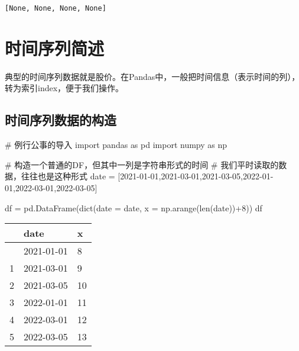 \documentclass[
  letterpaper,
  DIV=11,
  numbers=noendperiod]{scrreprt}
\newenvironment{Shaded}{\begin{snugshade}}{\end{snugshade}}
\newcommand{\BuiltInTok}[1]{\textcolor[rgb]{0.00,0.23,0.31}{#1}}
\newcommand{\CommentTok}[1]{\textcolor[rgb]{0.37,0.37,0.37}{#1}}
\newcommand{\DecValTok}[1]{\textcolor[rgb]{0.68,0.00,0.00}{#1}}
\newcommand{\ImportTok}[1]{\textcolor[rgb]{0.00,0.46,0.62}{#1}}
\newcommand{\NormalTok}[1]{\textcolor[rgb]{0.00,0.23,0.31}{#1}}
\newcommand{\OperatorTok}[1]{\textcolor[rgb]{0.37,0.37,0.37}{#1}}
\newcommand{\StringTok}[1]{\textcolor[rgb]{0.13,0.47,0.30}{#1}}
\begin{document}
\begin{verbatim}
[None, None, None, None]
\end{verbatim}

\hypertarget{ux65f6ux95f4ux5e8fux5217ux7b80ux8ff0}{%
\section{时间序列简述}\label{ux65f6ux95f4ux5e8fux5217ux7b80ux8ff0}}

典型的时间序列数据就是股价。在Pandas中，一般把时间信息（表示时间的列），转为索引index，便于我们操作。

\hypertarget{ux65f6ux95f4ux5e8fux5217ux6570ux636eux7684ux6784ux9020}{%
\subsection{时间序列数据的构造}\label{ux65f6ux95f4ux5e8fux5217ux6570ux636eux7684ux6784ux9020}}

\begin{Shaded}
\begin{Highlighting}[]
\CommentTok{\# 例行公事的导入}
\ImportTok{import}\NormalTok{ pandas }\ImportTok{as}\NormalTok{ pd}
\ImportTok{import}\NormalTok{ numpy }\ImportTok{as}\NormalTok{ np}

\CommentTok{\# 构造一个普通的DF，但其中一列是字符串形式的时间}
\CommentTok{\# 我们平时读取的数据，往往也是这种形式}
\NormalTok{date }\OperatorTok{=}\NormalTok{  [}\StringTok{\textquotesingle{}2021{-}01{-}01\textquotesingle{}}\NormalTok{,}\StringTok{\textquotesingle{}2021{-}03{-}01\textquotesingle{}}\NormalTok{,}\StringTok{\textquotesingle{}2021{-}03{-}05\textquotesingle{}}\NormalTok{,}\StringTok{\textquotesingle{}2022{-}01{-}01\textquotesingle{}}\NormalTok{,}\StringTok{\textquotesingle{}2022{-}03{-}01\textquotesingle{}}\NormalTok{,}\StringTok{\textquotesingle{}2022{-}03{-}05\textquotesingle{}}\NormalTok{]}

\NormalTok{df }\OperatorTok{=}\NormalTok{ pd.DataFrame(}\BuiltInTok{dict}\NormalTok{(date }\OperatorTok{=}\NormalTok{ date,}
\NormalTok{                       x }\OperatorTok{=}\NormalTok{ np.arange(}\BuiltInTok{len}\NormalTok{(date))}\OperatorTok{+}\DecValTok{8}\NormalTok{))}
\NormalTok{df}
\end{Highlighting}
\end{Shaded}

\begin{longtable}[]{@{}lll@{}}
\toprule\noalign{}
& date & x \\
\midrule\noalign{}
\endhead
\bottomrule\noalign{}
\endlastfoot
0 & 2021-01-01 & 8 \\
1 & 2021-03-01 & 9 \\
2 & 2021-03-05 & 10 \\
3 & 2022-01-01 & 11 \\
4 & 2022-03-01 & 12 \\
5 & 2022-03-05 & 13 \\
\end{longtable}
\end{document}
